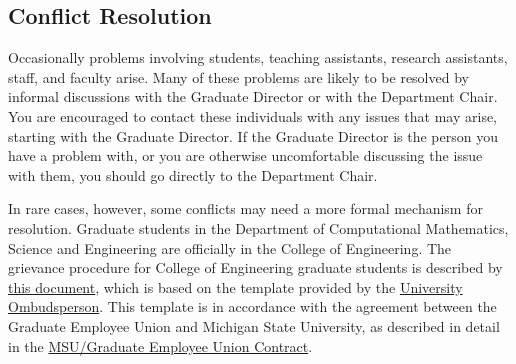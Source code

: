 \subsection{Conflict Resolution}

Occasionally problems involving students, teaching assistants,
research assistants, staff, and faculty arise.  Many of these problems
are likely to be resolved by informal discussions with the Graduate
Director or with the Department Chair.  You are encouraged to contact
these individuals with any issues that may arise, starting with the
Graduate Director.  If the Graduate Director is the person you have a
problem with, or you are otherwise uncomfortable discussing the issue
with them, you should go directly to the Department Chair.

In rare cases, however, some conflicts may need a more formal
mechanism for resolution.  Graduate students in the Department of
Computational Mathematics, Science and Engineering are officially in
the College of Engineering.  The grievance procedure for College of
Engineering graduate students is described by
\href{https://www.egr.msu.edu/sites/default/files/content/GRAD/2015\%20Grievance\%20Hearing\%20Procedure.pdf}{this
document}, which is based on the template provided by the
\href{https://msu.edu/unit/ombud/grievance-procedures/index.html}{University
Ombudsperson}.  This template is in accordance with the agreement
between the  Graduate Employee Union and Michigan State University, as
described in detail in the \href{https://www.hr.msu.edu/documents/contracts/GEU2015-2019.pdf}{MSU/Graduate
  Employee Union Contract}.






